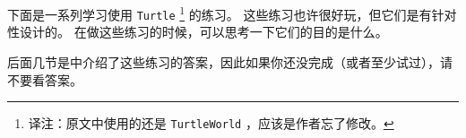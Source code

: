 下面是一系列学习使用 \lstinline{Turtle} \footnote{译注：原文中使用的还是 \lstinline{TurtleWorld} ，应该是作者忘了修改。} 的练习。
这些练习也许很好玩，但它们是有针对性设计的。
在做这些练习的时候，可以思考一下它们的目的是什么。


后面几节是中介绍了这些练习的答案，因此如果你还没完成（或者至少试过），请不要看答案。


